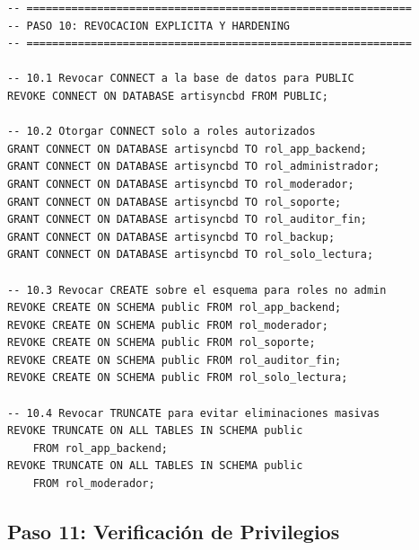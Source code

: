 \documentclass[conference, onecolumn]{IEEEtran}
\begin{document}
\begin{lstlisting}[caption={Revocación de privilegios y hardening}, label={lst:revocacion}]
-- ============================================================
-- PASO 10: REVOCACION EXPLICITA Y HARDENING
-- ============================================================

-- 10.1 Revocar CONNECT a la base de datos para PUBLIC
REVOKE CONNECT ON DATABASE artisyncbd FROM PUBLIC;

-- 10.2 Otorgar CONNECT solo a roles autorizados
GRANT CONNECT ON DATABASE artisyncbd TO rol_app_backend;
GRANT CONNECT ON DATABASE artisyncbd TO rol_administrador;
GRANT CONNECT ON DATABASE artisyncbd TO rol_moderador;
GRANT CONNECT ON DATABASE artisyncbd TO rol_soporte;
GRANT CONNECT ON DATABASE artisyncbd TO rol_auditor_fin;
GRANT CONNECT ON DATABASE artisyncbd TO rol_backup;
GRANT CONNECT ON DATABASE artisyncbd TO rol_solo_lectura;

-- 10.3 Revocar CREATE sobre el esquema para roles no admin
REVOKE CREATE ON SCHEMA public FROM rol_app_backend;
REVOKE CREATE ON SCHEMA public FROM rol_moderador;
REVOKE CREATE ON SCHEMA public FROM rol_soporte;
REVOKE CREATE ON SCHEMA public FROM rol_auditor_fin;
REVOKE CREATE ON SCHEMA public FROM rol_solo_lectura;

-- 10.4 Revocar TRUNCATE para evitar eliminaciones masivas
REVOKE TRUNCATE ON ALL TABLES IN SCHEMA public
    FROM rol_app_backend;
REVOKE TRUNCATE ON ALL TABLES IN SCHEMA public
    FROM rol_moderador;
\end{lstlisting}

\subsection{Paso 11: Verificación de Privilegios}
\end{document}
